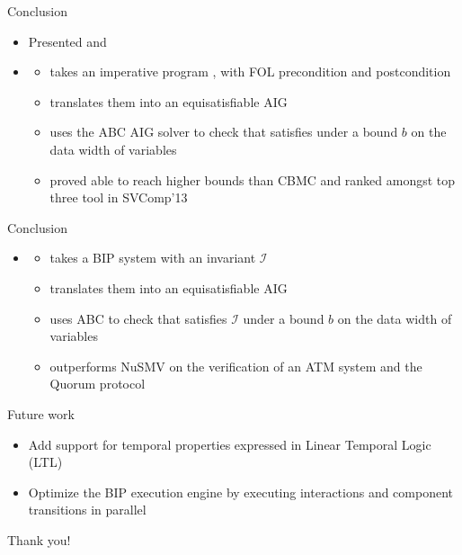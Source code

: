 \begin{frame}{Conclusion}
\begin{itemize}
\item Presented \mytool{} and \biptool{}
\item \mytool{}
\begin{itemize}
 \item takes an imperative program \Pm, with FOL precondition \Pre{} and postcondition \Post{}
 \item translates them into an equisatisfiable AIG \aigcircuit
 \item uses the ABC AIG solver to check that \Pm satisfies \pair{\Pre}{\Post} under a bound $b$ on
 the data width of variables
 \item proved able to reach higher bounds than CBMC and ranked amongst top
 three tool in SVComp'13
\end{itemize}
\end{itemize}
\end{frame}

\begin{frame}{Conclusion}
\begin{itemize}
\item \biptool{}
\begin{itemize}
 \item takes a BIP system \Pm with an invariant $\mathcal{I}$
 \item translates them into an equisatisfiable AIG \aigcircuit
 \item uses ABC to check that \Pm satisfies $\mathcal{I}$ under a bound $b$ on the
 data width of variables
 \item outperforms NuSMV on the verification of an ATM system and the Quorum protocol 
\end{itemize}
\end{itemize}
\end{frame}

\begin{frame}{Future work}
 \begin{itemize}
  \item Add support for temporal properties expressed in
  Linear Temporal Logic (LTL)
  \item Optimize the BIP execution engine by executing interactions and 
  component transitions in parallel
 \end{itemize}
\end{frame}

\begin{frame}{Thank you!}
\begin{figure}
 \centering
\end{figure}
\end{frame}